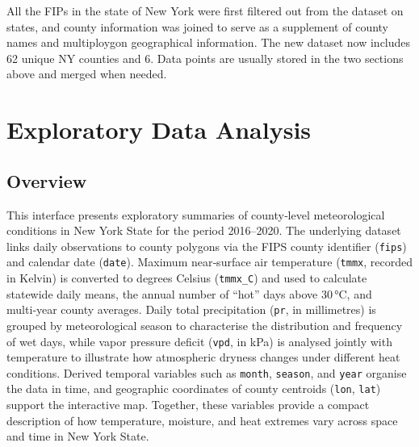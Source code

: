 \documentclass[
]{article}
\newenvironment{Shaded}{\begin{snugshade}}{\end{snugshade}}
\newcommand{\AttributeTok}[1]{\textcolor[rgb]{0.13,0.29,0.53}{#1}}
\newcommand{\ConstantTok}[1]{\textcolor[rgb]{0.56,0.35,0.01}{#1}}
\newcommand{\FunctionTok}[1]{\textcolor[rgb]{0.13,0.29,0.53}{\textbf{#1}}}
\newcommand{\NormalTok}[1]{#1}
\newcommand{\SpecialCharTok}[1]{\textcolor[rgb]{0.81,0.36,0.00}{\textbf{#1}}}
\begin{document}
All the FIPs in the state of New York were first filtered out from the
dataset on states, and county information was joined to serve as a
supplement of county names and multiploygon geographical information.
The new dataset now includes 62 unique NY counties and 6. Data points
are usually stored in the two sections above and merged when needed.

\section{\texorpdfstring{\textbf{Exploratory Data
Analysis}}{Exploratory Data Analysis}}\label{exploratory-data-analysis}

\subsection{Overview}\label{overview}

This interface presents exploratory summaries of county‑level
meteorological conditions in New York State for the period 2016--2020.
The underlying dataset links daily observations to county polygons via
the FIPS county identifier (\texttt{fips}) and calendar date
(\texttt{date}). Maximum near‑surface air temperature (\texttt{tmmx},
recorded in Kelvin) is converted to degrees Celsius (\texttt{tmmx\_C})
and used to calculate statewide daily means, the annual number of
``hot'' days above 30\,°C, and multi‑year county averages. Daily total
precipitation (\texttt{pr}, in millimetres) is grouped by meteorological
season to characterise the distribution and frequency of wet days, while
vapor pressure deficit (\texttt{vpd}, in kPa) is analysed jointly with
temperature to illustrate how atmospheric dryness changes under
different heat conditions. Derived temporal variables such as
\texttt{month}, \texttt{season}, and \texttt{year} organise the data in
time, and geographic coordinates of county centroids (\texttt{lon},
\texttt{lat}) support the interactive map. Together, these variables
provide a compact description of how temperature, moisture, and heat
extremes vary across space and time in New York State.

\begin{Shaded}
\end{Shaded}
\end{document}
